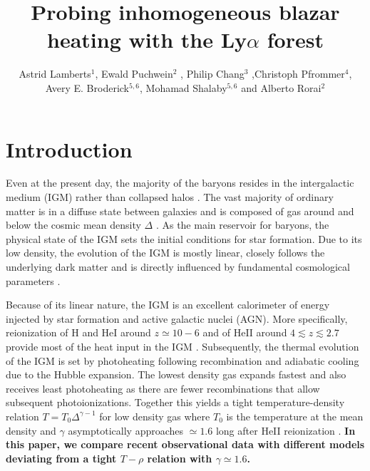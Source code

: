 \documentclass[numberedappendix]{emulateapj}
\newcommand\ALc[1]{{\color{red} \bf #1}} %
\begin{document}
\title{Probing inhomogeneous blazar heating with the Ly$\alpha$ forest}
\author{Astrid Lamberts$^1$,  Ewald Puchwein$^2$ , Philip Chang$^3$ ,Christoph Pfrommer$^4$, Avery E. Broderick$^{5,6}$,  Mohamad Shalaby$^{5,6}$ and Alberto Rorai$^2$}
\begin{abstract}

\end{abstract}
\keywords{}
\section{Introduction}

Even at the present day, the majority of the baryons resides in the intergalactic medium (IGM) rather than collapsed halos \citep{2012ApJ...759...23S}. The vast majority of ordinary matter is in a diffuse  state  between galaxies and is composed of gas around  and below the cosmic mean density $\Delta$ \citep[see][for a recent review]{2016ARA&A..54..313M}. As the main reservoir for baryons, the physical state of the IGM sets the initial conditions for star formation. Due to its low density, the evolution of the IGM is mostly linear, closely follows the underlying dark matter and is directly influenced by fundamental cosmological parameters \citep{2013A&A...559A..85P,2013JCAP...04..026S,2015JCAP...11..011P}.  

Because of its linear nature, the IGM is an excellent calorimeter of energy injected by star formation and active galactic nuclei (AGN). More specifically, reionization of H and HeI around $z\simeq 10-6$ \citep{2006ARA&A..44..415F} and of HeII around $4\lesssim z\lesssim 2.7$ provide most of the heat input in the IGM \citep{2009ApJ...694..842M,2011ApJ...733L..24W,2016ApJ...825..144W}. Subsequently, the thermal evolution of the IGM is set by photoheating following recombination and adiabatic cooling due to the Hubble expansion. The lowest density gas expands fastest and also receives least photoheating as there are fewer recombinations that allow subsequent photoionizations. Together this yields a tight temperature-density relation $T=T_0 \Delta ^{\gamma-1}$ for low density gas where $T_0$ is the temperature at the mean density and $\gamma$ asymptotically approaches $\simeq 1.6$  long after HeII reionization \citep{1997MNRAS.292...27H,2015MNRAS.450.4081P,2016MNRAS.456...47M}.  \ALc{In this paper, we compare recent observational data with different models deviating from a tight $T-\rho$ relation with $\gamma \simeq 1.6$. }
\end{document}
